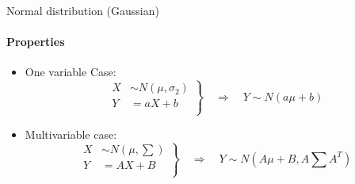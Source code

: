 \documentclass[aspectratio=169]{beamer}
\begin{document}
\begin{frame}{Normal distribution  (Gaussian)}
    \framesubtitle{Properties}
    \begin{itemize}
        \item One variable Case:
        \begin{equation}
            \left.
            \begin{aligned}
                    X & \sim N\left(\mu, \sigma_2\right)\\
                    Y & = aX + b\\
            \end{aligned} \right\}
            \quad \Rightarrow \quad Y \sim N\left(a\mu+b\right)
        \end{equation}
        \item Multivariable case:
        \begin{equation}
            \left.
            \begin{aligned}
                    X & \sim N\left(\mu, \textstyle\sum\right)\\
                    Y & = AX + B\\
            \end{aligned} \right\}
            \quad \Rightarrow \quad Y \sim N\left( A\mu+B, A\textstyle\sum A^T \right)
        \end{equation}
    \end{itemize}
\end{frame}
\end{document}
